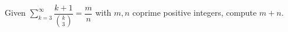 Given $\displaystyle\sum_{k=3}^{\infty}\dfrac{k+1}{\binom k3}=\dfrac mn$ with $m,n$ coprime positive integers, compute $m+n$.
